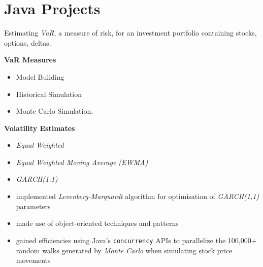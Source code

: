 \documentclass[../main.tex]{subfiles}
\begin{document}
 \section{Java Projects}
 \begin{description}[style=multiline,leftmargin=4cm]
 	\item[Value at Risk \textnormal{Dissertation} \textnormal{\tiny
 		      \href{https://adrian.ng/java/var/}{adrian.ng/java/var/}}]
 	      Estimating \textit{VaR}, a measure of risk, for an investment portfolio containing stocks, options, deltas.
 	      \begin{minipage}[b]{0.2\textwidth}
 		      \vspace{0.25cm}
 		      \textbf{VaR Measures}
 		      \begin{itemize}[leftmargin=*]
 			      \tiny
 			      \item Model Building
 			      \item Historical Simulation
 			      \item Monte Carlo Simulation.
 		      \end{itemize}
 		      \textbf{Volatility Estimates}
 		      \begin{itemize}[leftmargin=*]
 			      \tiny
 			      \item \textit{Equal Weighted}
 			      \item \textit{Equal Weighted Moving Average (EWMA)}
 			      \item \textit{GARCH(1,1)}
 		      \end{itemize}
 	      \end{minipage}
 	      \hspace{0.25cm}
 	      \begin{minipage}[b]{0.55\textwidth}
 		      \begin{itemize}[leftmargin=*]
 			      \item implemented \textit{Levenberg-Marquardt} algorithm for optimisation of \textit{GARCH(1,1)} parameters
 			      \item made use of object-oriented techniques and patterns
 			      \item gained efficiencies using Java's \texttt{concurrency} APIs to parallelize the 100,000+ random walks generated by \textit{Monte Carlo} when simulating stock price movements

\end{itemize}
\end{minipage}
\end{description}
\end{document}
